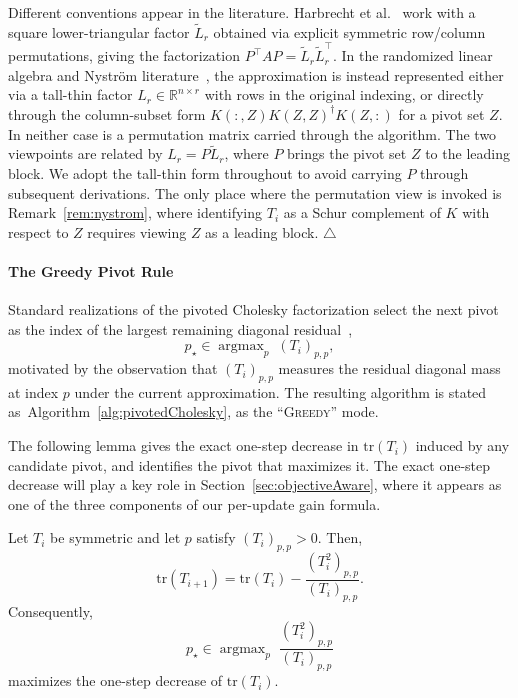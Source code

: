 \documentclass[onefignum,onetabnum]{siamart250211}
\newcommand{\tr}{\mathrm{tr}}
\DeclareMathOperator*{\argmax}{argmax}
\begin{document}
\begin{remark}
    Different conventions appear in the literature. Harbrecht et al.~\cite{harbrecht.2012} work with a square lower-triangular factor $\widetilde{L}_r$ obtained via explicit symmetric row/column permutations, giving the factorization $P^\top A P = \widetilde{L}_r \widetilde{L}_r^\top$. In the randomized linear algebra and Nystr\"om literature~\cite{chen.2025, gittens.2013, martinsson.2020}, the approximation is instead represented either via a tall-thin factor $L_r \in \mathbb{R}^{n \times r}$ with rows in the original indexing, or directly through the column-subset form $K(:,Z) K(Z,Z)^\dagger K(Z,:)$ for a pivot set $Z$. In neither case is a permutation matrix carried through the algorithm. The two viewpoints are related by $L_r = P\widetilde{L}_r$, where $P$ brings the pivot set $Z$ to the leading block. We adopt the tall-thin form throughout to avoid carrying $P$ through subsequent derivations. The only place where the permutation view is invoked is Remark~\ref{rem:nystrom}, where identifying $T_i$ as a Schur complement of $K$ with respect to $Z$ requires viewing $Z$ as a leading block.
    \hfill$\triangle$
\end{remark}

\paragraph{The Greedy Pivot Rule}
Standard realizations of the pivoted Cholesky factorization select the next pivot as the index of the largest remaining diagonal residual~\cite{harbrecht.2012},
\begin{equation}
\label{eq:greedy}
    p_\star \in \argmax_p\; (T_i)_{p,p},
\end{equation}
motivated by the observation that $(T_i)_{p,p}$ measures the residual diagonal mass at index $p$ under the current approximation.
The resulting algorithm is stated as~Algorithm~\ref{alg:pivotedCholesky}, as the ``\textsc{Greedy}'' mode.

The following lemma gives the exact one-step decrease in $\tr (T_i)$ induced by any candidate pivot, and identifies the pivot that maximizes it. The exact one-step decrease will play a key role in Section~\ref{sec:objectiveAware}, where it appears as one of the three components of our per-update gain formula.

\begin{lemma}
\label{lem:trace}
Let $T_i$ be symmetric and let $p$ satisfy $(T_i)_{p,p} > 0$.
Then,
\begin{equation*}
\label{eq:trace_decrease}
    \mathrm{tr}(T_{i+1})
    =
    \mathrm{tr}(T_i)
    -
    \frac{(T_i^2)_{p,p}}{(T_i)_{p,p}}.
\end{equation*}
Consequently,
\begin{equation}
\label{eq:trace_maximiser}
    p_\star \in \argmax_p\; \frac{(T_i^2)_{p,p}}{(T_i)_{p,p}}
\end{equation}
maximizes the one-step decrease of $\mathrm{tr}(T_i)$.
\end{lemma}
\end{document}
